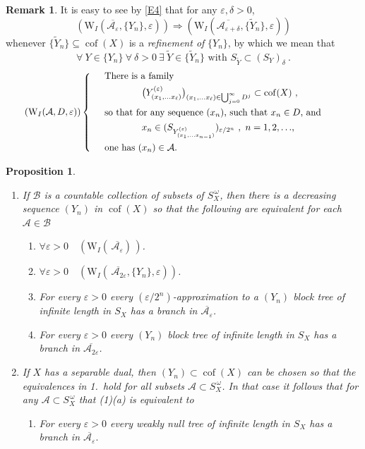 \documentclass[11pt,leqno]{amsart}
\newtheorem{prop}[thm]{Proposition}
\theoremstyle{definition}
\newtheorem*{remark}{Remark}
\newcommand{\vp}{\varepsilon}
\newcommand{\cof}{\operatorname{cof}}
\newcommand{\cA}{\mathcal{A}}
\newcommand{\cB}{\mathcal{B}}
\begin{document}
\begin{remark} 
It is easy to see by \eqref{E4} that for any $\vp,\delta>0$, 
$$(\text{W}_I(\overline{\cA_{\vp}},\{Y_n\},\vp))\Rightarrow  
(\text{W}_I(\overline{\cA_{\vp+\delta}},\{\tilde Y_n\},\vp))$$
whenever $\{\tilde Y_n\}\subseteq \cof (X)$ is a {\em refinement of\/} 
$\{Y_n\}$, by which we mean that 
$$\forall\ Y\in\{Y_n\}\ \forall\ \delta>0\ \exists\ \tilde Y\in\{\tilde Y_n\}
\text{ with } S_{\tilde Y}\subset (S_Y)_\delta\ .$$   
\begin{equation}\tag*{$(\text{W}_I(\cA,D,\vp))$} 
\left\{ \begin{array}{cl}
&\text{There is a family}\\
\noalign{\vskip4pt}
&\qquad\qquad
\bigl(Y^{(\vp)}_{(x_1,\ldots x_\ell)}\bigr)_{(x_1,\ldots x_\ell)
\in\bigcup_{j=0}^\infty D^j}\subset \cof(X)\ ,\\
\noalign{\vskip4pt}
&\text{so that for any sequence $(x_n)$, such that $x_{n}\in D$, and}\\
\noalign{\vskip4pt}
&\qquad\qquad x_{n}\in ( S_{Y^{(\vp)}_{(x_1,\ldots x_{n-1})}})_{\vp/2^{n}}\ ,
\text{ $n=1,2,\ldots$,}\\
\noalign{\vskip4pt}
&\text{one has $(x_n)\in \cA$.}
\end{array} \hskip.5truein\right.
\end{equation}
\end{remark}

\begin{prop}\label{P2} 
  
\begin{enumerate}
\item If $\cB$ is a countable collection of subsets of  
$ S^{\,\omega}_X$, then there is a decreasing sequence  $(Y_n)$ 
in $\cof(X)$ so that the following are equivalent for each $\cA\in\cB$
\begin{enumerate}
\item[a)] $\forall\vp>0\quad (\text{W}_I(\,\overline{\cA_\vp})\,)$.
\item[b)] $\forall\vp>0\quad (\text{W}_I(\overline{\,\cA_{2\vp}},\{Y_n\},\vp))$.
\item[c)]  For every $\vp>0$ every $(\vp/2^n)$-approximation to a 
$(Y_n)$ block tree of infinite length in $S_X$  has a branch in 
$\overline{\cA_{\vp}}$.
\item[d)]  For every $\vp>0$ every  $(Y_n)$ block tree of infinite length in 
$S_X$  has a branch in $\overline{\cA_{2\vp}}$.
\end{enumerate}
  
\item  
If $X$ has a separable dual, then $(Y_n)\subset\cof(X)$ can be chosen so that
the equivalences in 1.\  
hold for all subsets $\cA\subset S^{\,\omega}_X$.
In that case it follows that
for any $\cA\subset S_X^{\,\omega}$ that (1)(a) is equivalent to       
\begin{enumerate}
\item[e)] For every $\vp>0$ every weakly null tree of infinite length in $S_X$  
has a branch in $\overline{\cA_\vp}.$
\end{enumerate}
\end{enumerate}
\end{prop}
  
\end{document}
